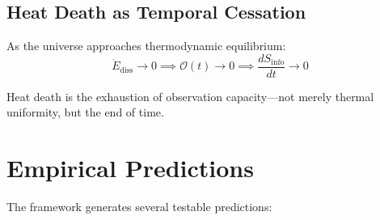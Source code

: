 \documentclass[12pt,a4paper]{article}
\begin{document}
\subsection{Heat Death as Temporal Cessation}

As the universe approaches thermodynamic equilibrium:
\begin{equation}
    \dot{E}_{\mathrm{diss}} \to 0 \implies \mathcal{O}(t) \to 0 \implies \frac{dS_{\mathrm{info}}}{dt} \to 0
\end{equation}

Heat death is the exhaustion of observation capacity---not merely thermal uniformity, but the end of time.

\section{Empirical Predictions}
\label{sec:predictions}

The framework generates several testable predictions:
\end{document}
